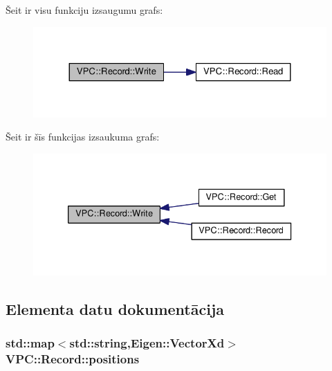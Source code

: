 Šeit ir visu funkciju izsaugumu grafs\+:
\nopagebreak
\begin{figure}[H]
\begin{center}
\leavevmode
\includegraphics[width=324pt]{class_v_p_c_1_1_record_a7d6345bdfc4e90a48bae74ffd3627ee5_cgraph}
\end{center}
\end{figure}




Šeit ir šīs funkcijas izsaukuma grafs\+:
\nopagebreak
\begin{figure}[H]
\begin{center}
\leavevmode
\includegraphics[width=333pt]{class_v_p_c_1_1_record_a7d6345bdfc4e90a48bae74ffd3627ee5_icgraph}
\end{center}
\end{figure}




\subsection{Elementa datu dokumentācija}
\subsubsection[{\texorpdfstring{positions}{positions}}]{\setlength{\rightskip}{0pt plus 5cm}std\+::map$<$std\+::string,Eigen\+::\+Vector\+Xd$>$ V\+P\+C\+::\+Record\+::positions}\hypertarget{class_v_p_c_1_1_record_aeea0f4576199ce09ffc7870c792624d0}{}\label{class_v_p_c_1_1_record_aeea0f4576199ce09ffc7870c792624d0}


